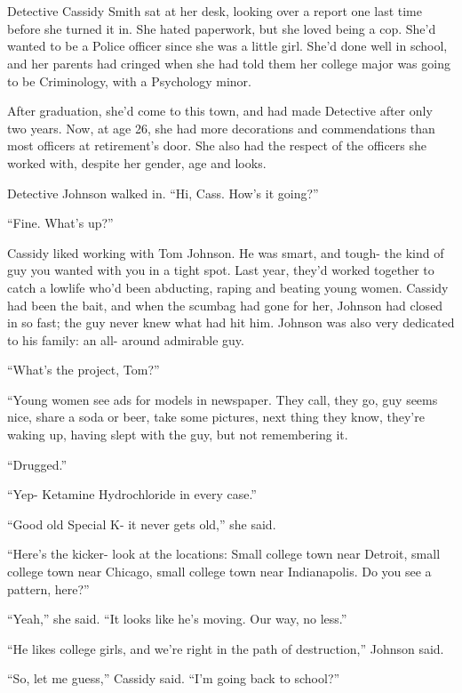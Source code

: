 \chapter{}
Detective Cassidy Smith sat at her desk, looking over a report one last time before she
turned it in. She hated paperwork, but she loved being a cop. She'd wanted to be a Police
officer since she was a little girl. She'd done well in school, and her parents had cringed when
she had told them her college major was going to be Criminology, with a Psychology minor.

After graduation, she'd come to this town, and had made Detective after only two years. Now,
at age 26, she had more decorations and commendations than most officers at retirement's door.
She also had the respect of the officers she worked with, despite her gender, age and looks.

Detective Johnson walked in. ``Hi, Cass. How's it going?''

``Fine. What's up?''

Cassidy liked working with Tom Johnson. He was smart, and tough- the kind of guy you wanted
with you in a tight spot. Last year, they'd worked together to catch a lowlife who'd been
abducting, raping and beating young women. Cassidy had been the bait, and when the scumbag had
gone for her, Johnson had closed in so fast; the guy never knew what had hit him. Johnson was
also very dedicated to his family: an all- around admirable guy.

``What's the project, Tom?''

``Young women see ads for models in newspaper. They call, they go, guy seems nice, share a
soda or beer, take some pictures, next thing they know, they're waking up, having slept with the
guy, but not remembering it.

``Drugged.''

``Yep- Ketamine Hydrochloride in every case.''

``Good old Special K- it never gets old,'' she said.

``Here's the kicker- look at the locations: Small college town near Detroit, small college
town near Chicago, small college town near Indianapolis. Do you see a pattern, here?''

``Yeah,'' she said. ``It looks like he's moving. Our way, no less.''

``He likes college girls, and we're right in the path of destruction,'' Johnson said.

``So, let me guess,'' Cassidy said. ``I'm going back to school?''

